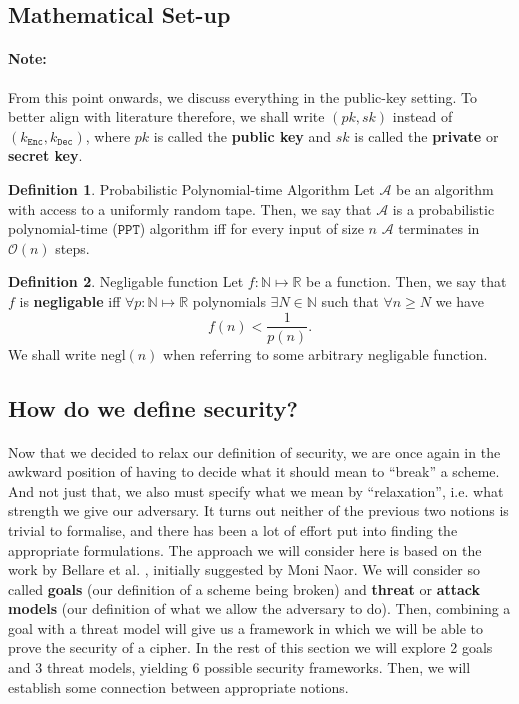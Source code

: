 \documentclass{article}
\theoremstyle{definition}
\newtheorem{definition}{Definition}[section]
\newcommand{\Enc}{\texttt{Enc}}
\newcommand{\Dec}{\texttt{Dec}}
\newcommand{\A}{\mathcal{A}}
\newcommand{\Oh}{\mathcal{O}}
\newcommand{\Nat}{\mathbb{N}}
\newcommand{\Reals}{\mathbb{R}}
\newcommand{\PPT}{\texttt{PPT}}
\newcommand{\negl}{\text{negl}}
\begin{document}
\subsection{Mathematical Set-up}
\paragraph{Note:} From this point onwards, we discuss everything in the
public-key setting. To better align with literature therefore, we shall write
$(pk, sk)$ instead of $(k_\Enc, k_\Dec)$, where $pk$ is called the \textbf{public key}
and $sk$ is called the \textbf{private} or \textbf{secret key}.
\begin{definition}{Probabilistic Polynomial-time Algorithm}
 Let $\A$ be an algorithm with access to a uniformly random tape. Then, we say that $\A$
 is a probabilistic polynomial-time ($\PPT$) algorithm iff for every input of size
 $n$ $\A$ terminates in $\Oh(n)$ steps. 
\end{definition}
\begin{definition}{Negligable function}
  Let $f: \Nat \mapsto \Reals$ be a function. Then, we say that $f$ is
  \textbf{negligable} iff $\forall p: \Nat \mapsto \Reals$ polynomials $\exists
  N \in \Nat$ such that $\forall n \geq N$ we have
  \[
    f(n) < \frac{1}{p(n)}. 
  \]
  We shall write $\negl(n)$ when referring to some arbitrary negligable function.
\end{definition}
\subsection{How do we define security?}
\label{sec:howdefsec}
\paragraph{} Now that we decided to relax our definition of security, we are
once again in the awkward position of having to decide what it should mean to
``break'' a scheme. And not just that, we also must specify what we mean by
``relaxation'', i.e. what strength we give our adversary. It turns out neither
of the previous two notions is trivial to formalise, and there has been a lot of
effort put into finding the appropriate formulations. The approach we will consider here is based on the work by Bellare
et al. \cite{bellaresecurityrelations}, initially suggested by Moni
Naor\footnotemark. We will consider so
called \textbf{goals} (our definition of a scheme being broken) and \textbf{threat} or
\textbf{attack models} (our definition of what we allow the adversary to do).
Then, combining a goal with a threat model will give us a framework in which we
will be able to prove the security of a cipher. In the rest of this section we
will explore 2 goals and 3 threat models, yielding 6 possible security
frameworks. Then, we will establish some connection between appropriate notions.
\end{document}

